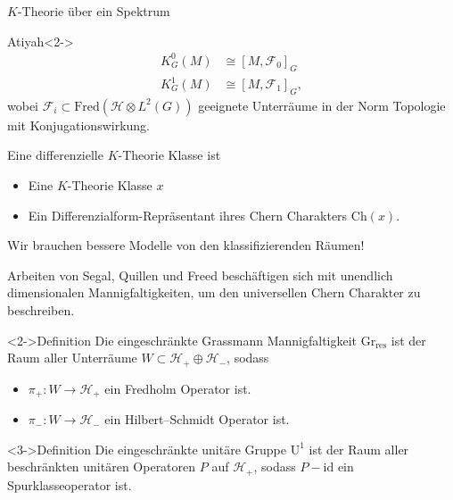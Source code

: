 \documentclass[12pt,utf8,notheorems,compress,t]{beamer}
\renewcommand{\_}{\mathpunct{.}}
\newcommand{\?}{\,{:}\,}
\newcommand{\Ch}{\mathrm{Ch}}
\begin{document}
\begin{frame}{$K$-Theorie über ein Spektrum}
    \begin{exampleblock}{Atiyah}<2->{}
        \vspace{-1em}
        \begin{align*}
            K_G^0(M) &\cong [M,  \mathscr{F}_0]_G \\
            K_G^1(M) &\cong [M, \mathscr{F}_1]_G,
        \end{align*}
        wobei $\mathscr{F}_i\subset \mathrm{Fred}(\mathcal{H}\otimes L^2(G))$
        geeignete Unterräume in der Norm Topologie mit Konjugationswirkung.
    \end{exampleblock}
\end{frame}
\begin{frame}
    Eine differenzielle $K$-Theorie Klasse ist 
    \begin{itemize}
        \item<2-> Eine $K$-Theorie Klasse $x$
        \item<3-> Ein Differenzialform-Repräsentant ihres Chern Charakters
            $\Ch(x)$.
    \end{itemize}
     Wir brauchen bessere Modelle von den
    klassifizierenden Räumen!
    
\end{frame}
\begin{frame}
    Arbeiten von Segal, Quillen und Freed beschäftigen sich mit unendlich
    dimensionalen Mannigfaltigkeiten, um den universellen Chern Charakter zu
    beschreiben.
    \begin{block}<2->{Definition}
        Die eingeschränkte Grassmann Mannigfaltigkeit
        $\mathrm{Gr}_{\mathrm{res}}$ ist der Raum aller Unterräume $W\subset
        \mathcal{H}_+ \oplus \mathcal{H}_-$, sodass 
        \begin{itemize}
            \item $\pi_+\colon W\to \mathcal{H}_+$ ein Fredholm Operator ist.
            \item $\pi_-\colon W \to \mathcal{H}_-$ ein Hilbert--Schmidt
                Operator ist.
        \end{itemize}
    \end{block}
    \begin{block}<3->{Definition}
        Die eingeschränkte unitäre Gruppe $\mathrm U^1$ ist der Raum aller
        beschränkten
        unitären Operatoren $P$ auf $\mathcal{H}_+$, sodass $P-\mathrm{id}$ ein
        Spurklasseoperator ist.
    \end{block}
\end{frame}
\end{document}
